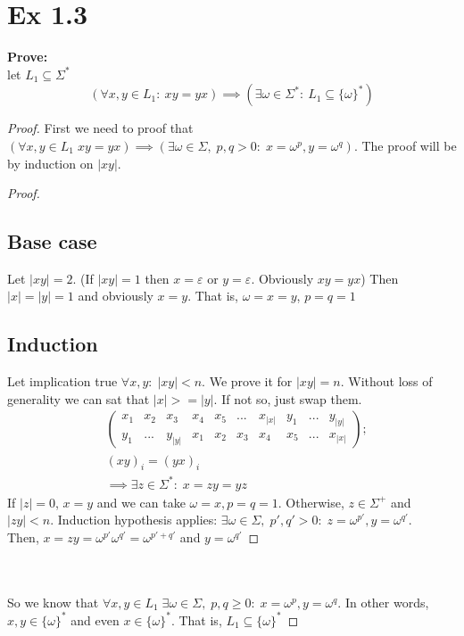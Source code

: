 
\section*{Ex 1.3}
\begin{mdframed}
	\textbf{Prove:} \\
	let $L_1 \subseteq \Sigma^*$
	\[
		\left( \forall x,y \in L_1 :\: xy = yx \right) \implies \left( \exists \omega \in \Sigma^* :\: L_1 \subseteq \{\omega\}^* \right)
	\]
\end{mdframed}

\begin{proof}
First we need to proof that $(\forall x,y \in L_1 \; xy=yx) \implies 
(\exists \omega \in \Sigma,\; p,q >0:\; x = \omega^p, y = \omega^q)$.
The proof will be by induction on $|xy|$.\\

\hfill\begin{minipage}{\dimexpr\textwidth-1cm}
\begin{proof}
	\subsection*{Base case}
	Let $|xy| = 2$. (If $|xy|=1$ then $x=\varepsilon$ or $y=\varepsilon$. Obviously $xy=yx$)
	Then $|x| = |y| = 1$ and obviously $x = y$. That is, $\omega = x = y$, $p=q=1$

	\subsection*{Induction}
	Let implication true $\forall x,y :\; |xy| < n$. We prove it for $|xy| = n$.
	Without loss of generality we can sat that $|x| >= |y|$. If not so, just swap them.
	\begin{align*}
		& \begin{pmatrix}
		x_1 & x_2 & x_3 & x_4 & x_5 & ... & x_{|x|} & y_1 & ... & y_{|y|} \\
		y_1 & ... & y_{|y|} & x_1 & x_2 & x_3 & x_4 & x_5 & ... & x_{|x|} 
		\end{pmatrix}; \\
		& (xy)_i = (yx)_i \\
		& \implies \exists z \in \Sigma^* :\; x = zy = yz
	\end{align*}
	If $|z| = 0$, $x=y$ and we can take $\omega = x, p=q=1$.
	Otherwise, $z \in \Sigma^+$ and $|zy| < n$. 
	Induction hypothesis applies: $\exists \omega \in \Sigma,\; p',q' >0:\; z = \omega^{p'}, y = \omega^{q'}$.\\
	Then, $x = zy = \omega^{p'} \omega^{q'} = \omega^{p' + q'}$ and $y = \omega^{q'}$
\end{proof}
\end{minipage}
\\ \\
So we know that $\forall x,y \in L_1 \; \exists \omega \in \Sigma,\; p,q \ge 0:\; x = \omega^p, y = \omega^q$.
In other words, $x,y \in \{\omega\}^*$ and even $x \in \{\omega\}^*$.
That is, $L_1 \subseteq \{\omega\}^*$
\end{proof}
